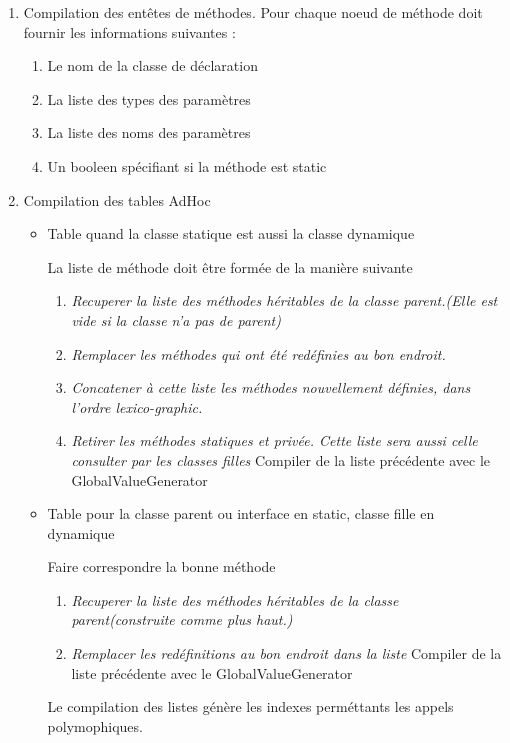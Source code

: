 \documentclass{article}
\begin{document}
\begin{enumerate}
  \item Compilation des entêtes de méthodes.
    Pour chaque noeud de méthode doit fournir les informations suivantes :
   \begin{enumerate}
    \item Le nom de la classe de déclaration
    \item La liste des types des paramètres
    \item La liste des noms des paramètres
    \item Un booleen spécifiant si la méthode est static
   \end{enumerate}

   \item Compilation des tables AdHoc
    \begin{itemize}
      \item Table quand la classe statique est aussi la classe dynamique     

       La liste de méthode doit être formée de la manière suivante
      \begin{enumerate}
       \item \emph{Recuperer la liste des méthodes héritables de la classe parent.(Elle est vide si la classe n'a pas de parent)}
       \item \emph{Remplacer les méthodes qui ont été redéfinies au bon endroit.}
       \item \emph{Concatener à cette liste les méthodes nouvellement définies, dans l'ordre lexico-graphic.}
       \item \emph{Retirer les méthodes statiques et privée. Cette liste sera aussi celle consulter par les classes filles}
      Compiler de la liste précédente avec le GlobalValueGenerator
      \end{enumerate}
      \item Table pour la classe parent ou interface en static, classe fille en dynamique

      Faire correspondre la bonne méthode
       \begin{enumerate}
         \item \emph{Recuperer la liste des méthodes héritables de la classe parent(construite comme plus haut.)}
         \item \emph{Remplacer les redéfinitions au bon endroit dans la liste}
      Compiler de la liste précédente avec le GlobalValueGenerator         
       \end{enumerate}
       Le compilation des listes génère les indexes perméttants les appels polymophiques.
    \end{itemize}


\end{enumerate}
\end{document}
